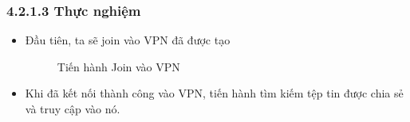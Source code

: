  \subsubsection*{4.2.1.3 Thực nghiệm}
\begin{itemize}
    \item Đầu tiên, ta sẽ join vào VPN đã được tạo
    \begin{figure}[htbp]
            \hfill
            \hfill
            \caption{Tiến hành Join vào VPN}
        \end{figure}
    \item Khi đã kết nối thành công vào VPN, tiến hành tìm kiếm tệp tin được chia sẻ và truy cập vào nó.
    \begin{figure}[htbp]
            \hfill

\end{figure}
\end{itemize}
